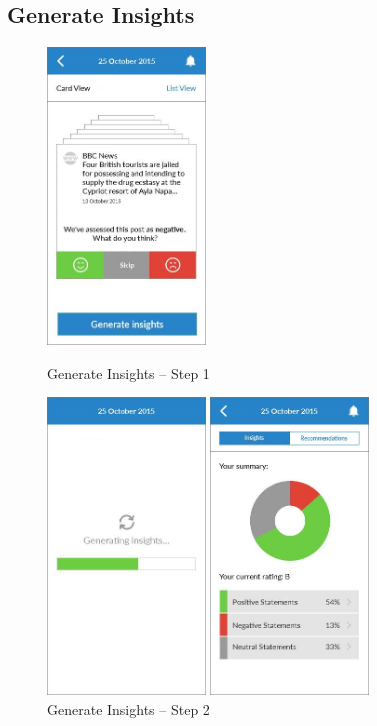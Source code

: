 \clearpage

\subsection{Generate Insights}

\begin{figure}
  \subfigures
  \centering
  \begin{minipage}{4.6cm}
    \centering
    \includegraphics[width=4.2cm]{inc/ui_insight_step1.jpg}
    \caption{Generate Insights -- Step 1}
    \label{fig:ui_insight_step1}
  \end{minipage}
  \begin{minipage}{4.6cm}
    \centering
    \includegraphics[width=4.2cm]{inc/ui_insight_step2.jpg}
    \caption{Generate Insights -- Step 2}
    \label{fig:ui_insight_step2}
  \end{minipage}
  \begin{minipage}{4.6cm}
    \centering
    \includegraphics[width=4.2cm]{inc/ui_insight_step3.jpg}

\end{minipage}
\end{figure}
